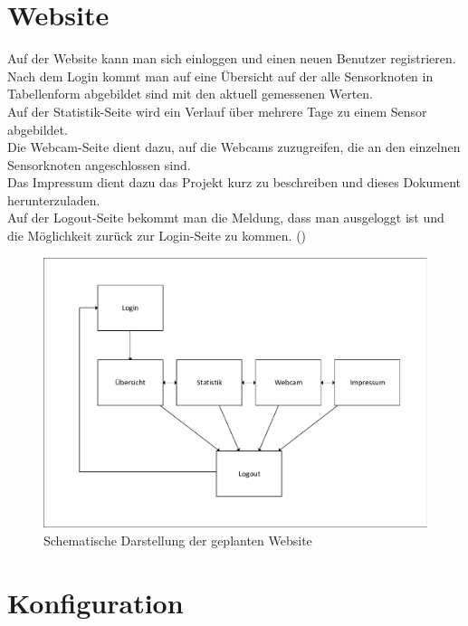 \section{Website}

Auf der Website kann man sich einloggen und einen neuen Benutzer registrieren.
Nach dem Login kommt man auf eine Übersicht auf der alle Sensorknoten in
Tabellenform abgebildet sind mit den aktuell gemessenen Werten. \\
Auf der Statistik-Seite wird ein Verlauf über mehrere Tage zu einem Sensor
abgebildet.\\
Die Webcam-Seite dient dazu, auf die Webcams zuzugreifen, die an den einzelnen Sensorknoten
angeschlossen sind.\\
Das Impressum dient dazu das Projekt kurz zu beschreiben und dieses Dokument
herunterzuladen.\\
Auf der Logout-Seite bekommt man die Meldung, dass man ausgeloggt ist und die
Möglichkeit zurück zur Login-Seite zu kommen.
()


\begin{figure} [htb]
\begin{centering}
\includegraphics[scale=0.8]{Bilder/struktur_website_einfach.pdf}
\caption[Schematische Darstellung der geplanten Website]{Schematische
Darstellung der geplanten Website}
\label{Darstellung_Website_einfach}
\end{centering}
\end{figure}


\section{Konfiguration}

